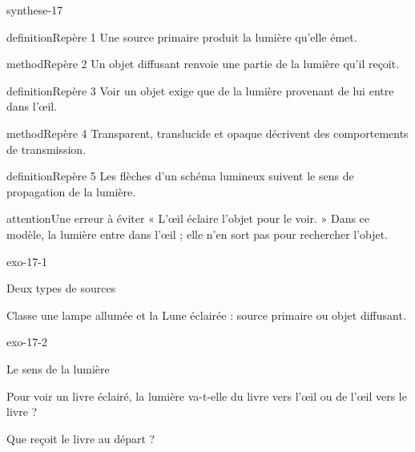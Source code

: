 \documentclass[12pt,twoside,openany]{book}
\begin{document}
\begin{pcFiche}{synthese-17}
\begin{pcEncadre}{definition}{Repère 1}
Une source primaire produit la lumière qu’elle émet.\par
\end{pcEncadre}
\begin{pcEncadre}{method}{Repère 2}
Un objet diffusant renvoie une partie de la lumière qu’il reçoit.\par
\end{pcEncadre}
\begin{pcEncadre}{definition}{Repère 3}
Voir un objet exige que de la lumière provenant de lui entre dans l’œil.\par
\end{pcEncadre}
\begin{pcEncadre}{method}{Repère 4}
Transparent, translucide et opaque décrivent des comportements de transmission.\par
\end{pcEncadre}
\begin{pcEncadre}{definition}{Repère 5}
Les flèches d’un schéma lumineux suivent le sens de propagation de la lumière.\par
\end{pcEncadre}
\begin{pcEncadre}{attention}{Une erreur à éviter}
« L’œil éclaire l’objet pour le voir. » Dans ce modèle, la lumière entre dans l’œil ; elle n’en sort pas pour rechercher l’objet.\par
\end{pcEncadre}
\end{pcFiche}
\clearpage{}
\begin{blocLivre}{exo-17-1}
\begin{exercice}[1]{Deux types de sources}
\begin{questions}
\item Classe une lampe allumée et la Lune éclairée : source primaire ou objet diffusant.
\end{questions}
\end{exercice}\end{blocLivre}
\begin{blocLivre}{exo-17-2}
\begin{exercice}[1]{Le sens de la lumière}
\begin{questions}
\item Pour voir un livre éclairé, la lumière va-t-elle du livre vers l’œil ou de l’œil vers le livre ?
\item Que reçoit le livre au départ ?
\end{questions}
\end{exercice}\end{blocLivre}
\end{document}
